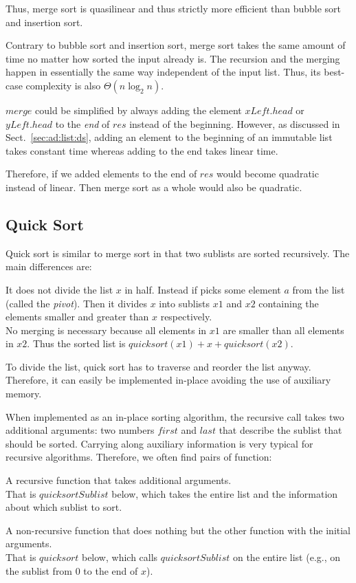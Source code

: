 Thus, merge sort is quasilinear and thus strictly more efficient than bubble sort and insertion sort.

Contrary to bubble sort and insertion sort, merge sort takes the same amount of time no matter how sorted the input already is.
The recursion and the merging happen in essentially the same way independent of the input list.
Thus, its best-case complexity is also $\Theta(n\log_2 n)$.

\begin{remark}
$merge$ could be simplified by always adding the element $xLeft.head$ or $yLeft.head$ to the \emph{end} of $res$ instead of the beginning.
However, as discussed in Sect.~\ref{sec:ad:list:ds}, adding an element to the beginning of an immutable list takes constant time whereas adding to the end takes linear time.

Therefore, if we added elements to the end of $res$ would become quadratic instead of linear.
Then merge sort as a whole would also be quadratic.
\end{remark}

\subsection{Quick Sort}

Quick sort is similar to merge sort in that two sublists are sorted recursively.
The main differences are:
\begin{compactitem}
 \item It does not divide the list $x$ in half.
  Instead if picks some element $a$ from the list (called the \emph{pivot}).
  Then it divides $x$ into sublists $x1$ and $x2$ containing the elements smaller and greater than $x$ respectively.\\
  No merging is necessary because all elements in $x1$ are smaller than all elements in $x2$.
  Thus the sorted list is $quicksort(x1)+x+quicksort(x2)$.
 \item To divide the list, quick sort has to traverse and reorder the list anyway.
 Therefore, it can easily be implemented in-place avoiding the use of auxiliary memory.
\end{compactitem}

When implemented as an in-place sorting algorithm, the recursive call takes two additional arguments: two numbers $first$ and $last$ that describe the sublist that should be sorted.
Carrying along auxiliary information is very typical for recursive algorithms.
Therefore, we often find pairs of function:
 \begin{compactitem}
  \item A recursive function that takes additional arguments.\\
   That is $quicksortSublist$ below, which takes the entire list and the information about which sublist to sort.
  \item A non-recursive function that does nothing but the other function with the initial arguments.\\
   That is $quicksort$ below, which calls $quicksortSublist$ on the entire list (e.g., on the sublist from $0$ to the end of $x$).
 \end{compactitem}

